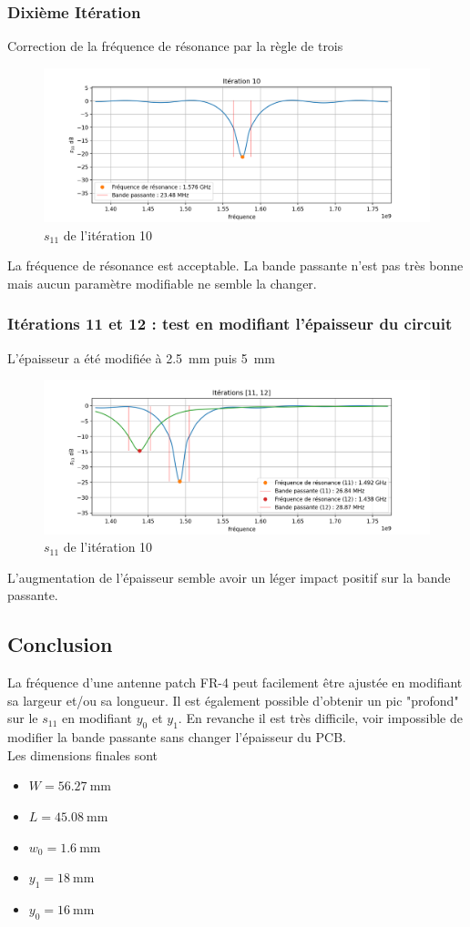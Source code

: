 \documentclass[Deriaz_Traiber_Labo02.tex]{subfiles}
\begin{document}
\subsubsection{Dixième Itération}
Correction de la fréquence de résonance par la règle de trois
\begin{figure}[H]
\centering
\includegraphics[width=15cm]{../Calculs/run_id_fr4_10.png}
\caption[caption]{$s_{11}$ de l'itération 10}
\end{figure}
La fréquence de résonance est acceptable. La bande passante n'est pas très bonne mais aucun paramètre modifiable ne semble la changer.
\subsubsection{Itérations 11 et 12 : test en modifiant l'épaisseur du circuit}
L'épaisseur a été modifiée à \SI{2.5}{\milli\meter} puis \SI{5}{\milli\meter}
\begin{figure}[H]
\centering
\includegraphics[width=15cm]{../Calculs/run_id_fr4_1112.png}
\caption[caption]{$s_{11}$ de l'itération 10}
\end{figure}
L'augmentation de l'épaisseur semble avoir un léger impact positif sur la bande passante.
\pagebreak
\subsection{Conclusion}
La fréquence d'une antenne patch FR-4 peut facilement être ajustée en modifiant sa largeur et/ou sa longueur. Il est également possible d'obtenir un pic "profond" sur le $s_{11}$ en modifiant $y_0$ et $y_1$. En revanche il est très difficile, voir impossible de modifier la bande passante sans changer l'épaisseur du PCB.\\
Les dimensions finales sont
\begin{itemize}
\item $W=\SI{56.27}{\milli\meter}$
\item $L=\SI{45.08}{\milli\meter}$
\item $w_0=\SI{1.6}{\milli\meter}$
\item $y_1=\SI{18}{\milli\meter}$
\item $y_0=\SI{16}{\milli\meter}$
\end{itemize}
\end{document}
